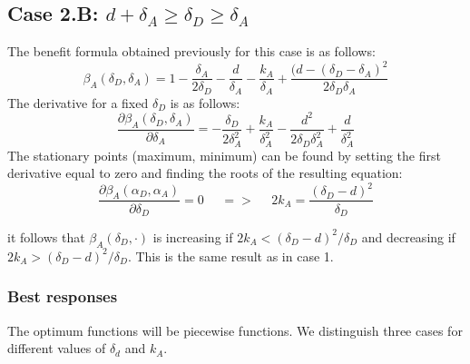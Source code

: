 \subsection*{Case 2.B: $d+\delta_{A} \geq \delta_{D} \geq  \delta_{A} $} 

The benefit formula obtained previously for this case is as follows: 
\begin{equation*}
\beta_{A}(\delta_{D},\delta_{A}) = 1 - \dfrac{\delta_{A}}{2\delta_{D}} - \dfrac{d}{\delta_{A}} - \dfrac{k_{A}}{\delta_{A}} + \dfrac{(d-(\delta_{D}-\delta_{A})^{2}}{2\delta_{D}\delta_{A}} 
\end{equation*}
The derivative for a fixed $\delta_{D}$ is as follows:
\begin{equation*}
\dfrac{\partial \beta_{A}(\delta_{D},\delta_{A})}{\partial \delta_{A}} = -\dfrac{\delta_{D}}{2\delta_{A}^{2}} + \dfrac{k_{A}}{\delta_{A}^{2}} - \dfrac{d^{2}}{2\delta_{D}\delta_{A}^{2}} + \dfrac{d}{\delta_{A}^{2}}
\end{equation*}
The stationary points (maximum, minimum) can be found by setting the first derivative equal to zero and finding the roots of the resulting equation:
\begin{equation*}
\frac{\partial \beta_{A}(\alpha_{D},\alpha_{A})}{\partial \delta_{D}} =0 ~~~~~~ =>~~~~~~ 2k_{A} = \dfrac{(\delta_{D}-d)^{2}}{\delta_{D}}
\end{equation*}

it follows that $\beta_{A}(\delta_{D},\cdot)$ is increasing if $2k_{A} < (\delta_{D} - d)^{2} / \delta_{D}$ and decreasing if $2k_{A} > (\delta_{D} - d)^{2} / \delta_{D}$. This is the same result as in case 1.\\


\subsubsection{Best responses}
The optimum functions will be piecewise functions. We distinguish three cases for different values of $\delta_{d}$ and $k_{A}$. 


